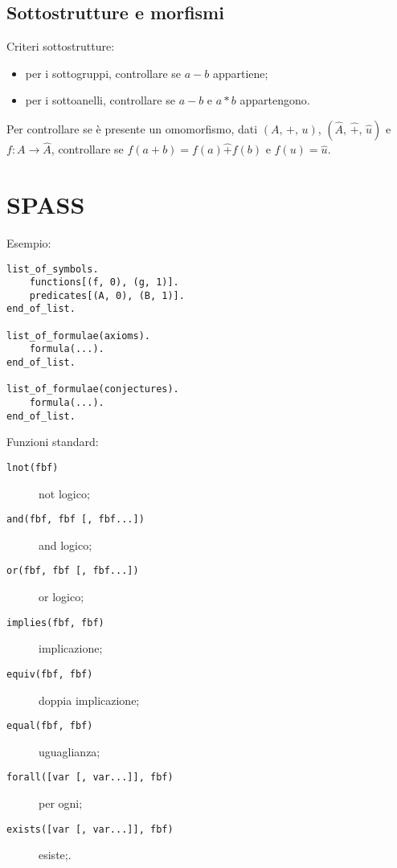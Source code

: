 \documentclass[10pt]{article}
\begin{document}
        \subsection*{Sottostrutture e morfismi}

            Criteri sottostrutture:
            \begin{itemize}
                \item per i sottogruppi, controllare se \(a - b\) appartiene;
                \item per i sottoanelli, controllare se \(a - b\) e \(a * b\) appartengono.
            \end{itemize}

            Per controllare se è presente un omomorfismo, dati \((A, \, +, \, u)\), \((\hat{A}, \, \hat{+}, \, \hat{u})\) e
            \(f : A \to \hat{A}\), controllare se \(f(a + b) = f(a) \hat{+} f(b)\) e \(f(u) = \hat{u}\).

    \section*{SPASS}

            \begin{minipage}[h]{.4\textwidth}
                Esempio:
                \begin{verbatim}
list_of_symbols.
    functions[(f, 0), (g, 1)].
    predicates[(A, 0), (B, 1)].
end_of_list.

list_of_formulae(axioms).
    formula(...).
end_of_list.

list_of_formulae(conjectures).
    formula(...).
end_of_list.
                \end{verbatim}
            \end{minipage}
            \begin{minipage}[h]{.6\textwidth}
                Funzioni standard:
                \begin{description}
                    \item[\texttt{lnot(fbf)}] not logico;
                    \item[\texttt{and(fbf, fbf [, fbf...])}] and logico;
                    \item[\texttt{or(fbf, fbf [, fbf...])}] or logico;
                    \item[\texttt{implies(fbf, fbf)}] implicazione;
                    \item[\texttt{equiv(fbf, fbf)}] doppia implicazione;
                    \item[\texttt{equal(fbf, fbf)}] uguaglianza;
                    \item[\texttt{forall([var [, var...]], fbf)}] per ogni;
                    \item[\texttt{exists([var [, var...]], fbf)}] esiste;.
                \end{description}
            \end{minipage}
\end{document}
